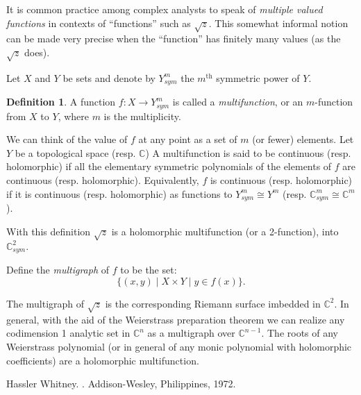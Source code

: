 \documentclass[12pt]{article}
\theoremstyle{theorem}
\theoremstyle{definition}
\newtheorem*{defn}{Definition}
\theoremstyle{remark}
\begin{document}
It is common practice among complex analysts to speak of {\em multiple valued functions} in contexts of ``functions'' such as $\sqrt{z}.$  This somewhat informal notion can be made very precise when the ``function'' has finitely many values (as the $\sqrt{z}$ does).

Let $X$ and $Y$ be sets and denote by
$Y^m_{sym}$ the $m^{\text{th}}$ symmetric power of $Y.$

\begin{defn}
A function $f \colon X \to Y^m_{sym}$ is called a {\em multifunction},
or an $m$-function from $X$ to $Y$, where $m$ is the multiplicity.
\end{defn}

We can think of the value of $f$ at any point as a set of $m$ (or fewer) elements.
Let $Y$ be a topological space (resp. ${\mathbb{C}}$)
A multifunction is said to be continuous (resp. holomorphic) if all the elementary symmetric polynomials of
the elements of $f$ are continuous (resp. holomorphic).  Equivalently, $f$ is continuous (resp. holomorphic)
if it is continuous (resp. holomorphic) as functions to $Y^m_{sym} \cong Y^m$
(resp. ${\mathbb{C}}^m_{sym} \cong {\mathbb{C}}^m$).

With this definition $\sqrt{z}$ is a holomorphic multifunction (or a 2-function), into ${\mathbb{C}}^2_{sym} .$

Define the {\em multigraph} of $f$ to be the set:
\begin{equation*}
\{ (x,y) \mid X \times Y \mid y \in f(x) \} .
\end{equation*}

The multigraph of $\sqrt{z}$ is the corresponding Riemann surface imbedded in ${\mathbb{C}}^2.$  In general, with the  aid of the Weierstrass preparation theorem we can realize any codimension 1 analytic set in ${\mathbb{C}}^n$ as a multigraph over ${\mathbb{C}}^{n-1} .$
The roots of any Weierstrass polynomial (or in general of any monic polynomial with holomorphic coefficients) are a holomorphic multifunction.


\begin{thebibliography}{9}
Hassler Whitney.
{\em {}}.
Addison-Wesley, Philippines, 1972.
\end{thebibliography}
\end{document}
